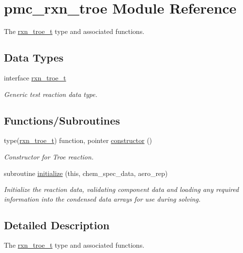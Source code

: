\hypertarget{namespacepmc__rxn__troe}{}\section{pmc\+\_\+rxn\+\_\+troe Module Reference}
\label{namespacepmc__rxn__troe}


The \mbox{\hyperlink{structpmc__rxn__troe_1_1rxn__troe__t}{rxn\+\_\+troe\+\_\+t}} type and associated functions.  


\subsection*{Data Types}
\begin{DoxyCompactItemize}
\item 
interface \mbox{\hyperlink{structpmc__rxn__troe_1_1rxn__troe__t}{rxn\+\_\+troe\+\_\+t}}
\begin{DoxyCompactList}\small\item\em Generic test reaction data type. \end{DoxyCompactList}\end{DoxyCompactItemize}
\subsection*{Functions/\+Subroutines}
\begin{DoxyCompactItemize}
\item 
type(\mbox{\hyperlink{structpmc__rxn__troe_1_1rxn__troe__t}{rxn\+\_\+troe\+\_\+t}}) function, pointer \mbox{\hyperlink{namespacepmc__rxn__troe_ae4ef42701effb43e507e4c34864821a1}{constructor}} ()
\begin{DoxyCompactList}\small\item\em Constructor for Troe reaction. \end{DoxyCompactList}\item 
subroutine \mbox{\hyperlink{namespacepmc__rxn__troe_a2a488c58d4247b8a4e876feb6686b150}{initialize}} (this, chem\+\_\+spec\+\_\+data, aero\+\_\+rep)
\begin{DoxyCompactList}\small\item\em Initialize the reaction data, validating component data and loading any required information into the condensed data arrays for use during solving. \end{DoxyCompactList}\end{DoxyCompactItemize}


\subsection{Detailed Description}
The \mbox{\hyperlink{structpmc__rxn__troe_1_1rxn__troe__t}{rxn\+\_\+troe\+\_\+t}} type and associated functions. 


